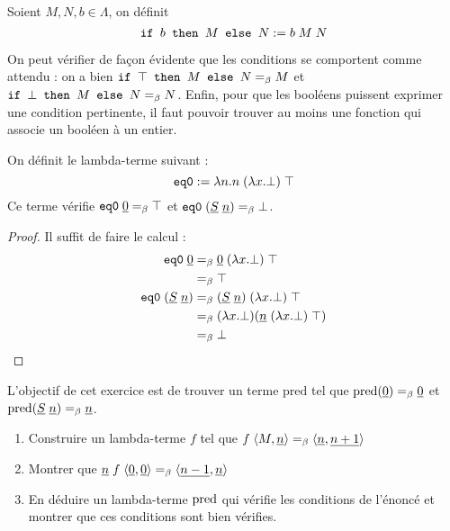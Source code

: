 \begin{defi}[Condition]
    Soient $M,N,b\in\Lambda$, on définit $$\texttt{if } b \texttt{ then } M\texttt{ else }N := b\;M\;N$$
\end{defi}

On peut vérifier de façon évidente que les conditions se comportent comme attendu : on a bien $\texttt{if } \top \texttt{ then } M\texttt{ else }N =_\beta M$ et $\texttt{if } \bot \texttt{ then } M\texttt{ else }N =_\beta N$. Enfin, pour que les booléens puissent exprimer une condition pertinente, il faut pouvoir trouver au moins une fonction qui associe un booléen à un entier.

\begin{defi}[\'Egalité à $0$]
    On définit le lambda-terme suivant : $$\texttt{eq0} := \lambda n. n\;(\lambda x.\bot)\;\top$$ Ce terme vérifie $\texttt{eq0}\;\underline 0 =_\beta \top$ et $\texttt{eq0}\;(\underline S\;\underline n) =_\beta \bot$.
\end{defi}

\begin{proof}
    Il suffit de faire le calcul :
    \begin{align*}
        \texttt{eq0}\;\underline 0 &=_\beta \underline 0 \;(\lambda x.\bot)\;\top\\
        &=_\beta \top\\
        \texttt{eq0}\;(\underline S\;\underline n) &=_\beta (\underline S\;\underline n)\;(\lambda x.\bot)\;\top\\
        &=_\beta (\lambda x.\bot)(\underline n\;(\lambda x.\bot)\;\top)\\
        &=_\beta \bot
    \end{align*}
\end{proof}

\begin{exo}
    L'objectif de cet exercice est de trouver un terme $\mathrm{pred}$ tel que $\mathrm{pred}(\underline 0)=_\beta \underline 0$ et $\mathrm{pred}(\underline S\;\underline n) =_\beta \underline n$.
    \begin{enumerate}
        \item Construire un lambda-terme $f$ tel que $f\;\langle M,\underline n\rangle =_\beta \langle \underline n,\underline{n+1}\rangle$
        \item Montrer que $\underline n \;f\;\langle \underline 0,\underline 0\rangle =_\beta \langle \underline{n-1},\underline{n}\rangle$
        \item En déduire un lambda-terme $\mathrm{pred}$ qui vérifie les conditions de l'énoncé et montrer que ces conditions sont bien vérifies.
    \end{enumerate}
\end{exo}

